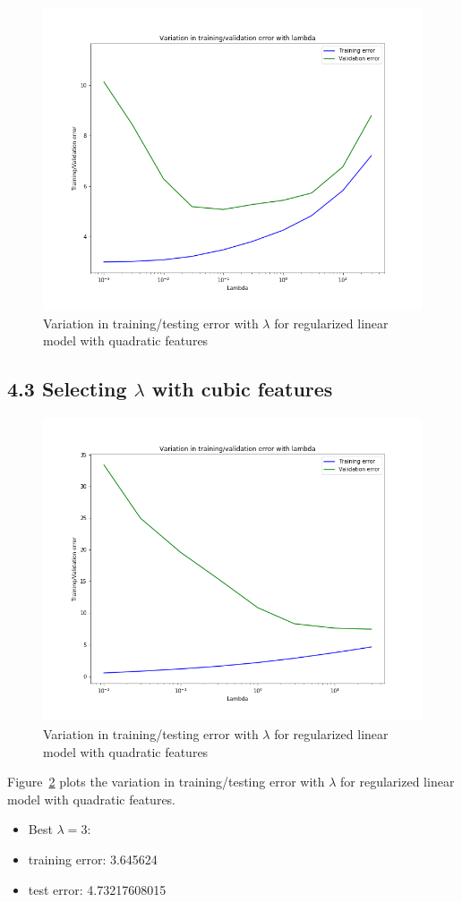\documentclass[english,11pt]{article}
\begin{document}
\begin{figure}[ht]
\centering
\includegraphics[width=.5\textwidth]{../hw1/part2/fig4_quadratic_lambda_03.png}
\caption{Variation in training/testing error with $\lambda$ for regularized linear model with quadratic features}
\label{fig:4_2}
\end{figure}




\subsection*{ 4.3 Selecting $\lambda$ with cubic features}
\begin{figure}[h]
\centering
\includegraphics[width=.5\textwidth]{../hw1/part2/fig4_cubic_lambda_3.png}
\caption{Variation in training/testing error with $\lambda$ for regularized linear model with quadratic features}
\label{fig:4_3}
\end{figure}

Figure~\ref{fig:4_3} plots the variation in training/testing error with $\lambda$ for regularized linear model with quadratic features. 
\begin{itemize}
\item Best $\lambda=3$:
\item training error:  3.645624
\item test error: 4.73217608015
\end{itemize}
\end{document}
